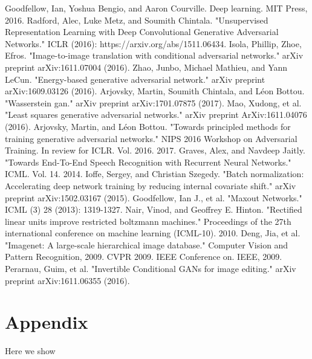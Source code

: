 \documentclass{article}
\begin{document}

\noindent [1] Goodfellow, Ian, Yoshua Bengio, and Aaron Courville. Deep learning. MIT Press, 2016. \newline
\noindent [2] Radford, Alec, Luke Metz, and Soumith Chintala. "Unsupervised Representation Learning with Deep Convolutional Generative Adversarial Networks." ICLR (2016): https://arxiv.org/abs/1511.06434. \newline
\noindent [3] Isola, Phillip, Zhoe, Efros. "Image-to-image translation with conditional adversarial networks." arXiv preprint arXiv:1611.07004 (2016). \newline
\noindent [4] Zhao, Junbo, Michael Mathieu, and Yann LeCun. "Energy-based generative adversarial network." arXiv preprint arXiv:1609.03126 (2016). \newline
\noindent [5] Arjovsky, Martin, Soumith Chintala, and Léon Bottou. "Wasserstein gan." arXiv preprint arXiv:1701.07875 (2017). \newline
\noindent [6] Mao, Xudong, et al. "Least squares generative adversarial networks." arXiv preprint ArXiv:1611.04076 (2016). \newline
\noindent [7] Arjovsky, Martin, and Léon Bottou. "Towards principled methods for training generative adversarial networks." NIPS 2016 Workshop on Adversarial Training. In review for ICLR. Vol. 2016. 2017. \newline
\noindent [8] Graves, Alex, and Navdeep Jaitly. "Towards End-To-End Speech Recognition with Recurrent Neural Networks." ICML. Vol. 14. 2014. \newline
\noindent [9] Ioffe, Sergey, and Christian Szegedy. "Batch normalization: Accelerating deep network training by reducing internal covariate shift." arXiv preprint arXiv:1502.03167 (2015). \newline
\noindent [10] Goodfellow, Ian J., et al. "Maxout Networks." ICML (3) 28 (2013): 1319-1327. \newline
\noindent [11] Nair, Vinod, and Geoffrey E. Hinton. "Rectified linear units improve restricted boltzmann machines." Proceedings of the 27th international conference on machine learning (ICML-10). 2010. \newline
\noindent [12] Deng, Jia, et al. "Imagenet: A large-scale hierarchical image database." Computer Vision and Pattern Recognition, 2009. CVPR 2009. IEEE Conference on. IEEE, 2009. \newline
\noindent [13] Perarnau, Guim, et al. "Invertible Conditional GANs for image editing." arXiv preprint arXiv:1611.06355 (2016). \newline


\appendix

\section{Appendix}
Here we show 
\end{document}

